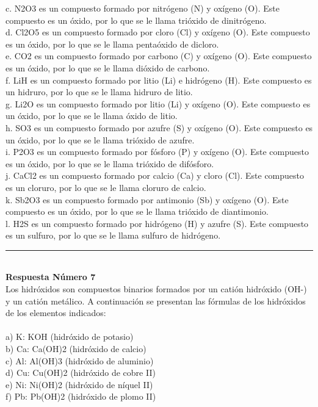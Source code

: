 \documentclass{article}
\begin{document}
c. N2O3 es un compuesto formado por nitrógeno (N) y oxígeno (O). Este compuesto es un óxido, por lo que se le llama trióxido de dinitrógeno.\\
d. Cl2O5 es un compuesto formado por cloro (Cl) y oxígeno (O). Este compuesto es un óxido, por lo que se le llama pentaóxido de dicloro.\\
e. CO2 es un compuesto formado por carbono (C) y oxígeno (O). Este compuesto es un óxido, por lo que se le llama dióxido de carbono.\\
f. LiH es un compuesto formado por litio (Li) e hidrógeno (H). Este compuesto es un hidruro, por lo que se le llama hidruro de litio.\\
g. Li2O es un compuesto formado por litio (Li) y oxígeno (O). Este compuesto es un óxido, por lo que se le llama óxido de litio.\\
h. SO3 es un compuesto formado por azufre (S) y oxígeno (O). Este compuesto es un óxido, por lo que se le llama trióxido de azufre.\\
i. P2O3 es un compuesto formado por fósforo (P) y oxígeno (O). Este compuesto es un óxido, por lo que se le llama trióxido de difósforo.\\
j. CaCl2 es un compuesto formado por calcio (Ca) y cloro (Cl). Este compuesto es un cloruro, por lo que se le llama cloruro de calcio.\\
k. Sb2O3 es un compuesto formado por antimonio (Sb) y oxígeno (O). Este compuesto es un óxido, por lo que se le llama trióxido de diantimonio.\\
l. H2S es un compuesto formado por hidrógeno (H) y azufre (S). Este compuesto es un sulfuro, por lo que se le llama sulfuro de hidrógeno.\\
\noindent\rule{\textwidth}{1pt} \\
\textbf{Respuesta Número 7} \\
Los hidróxidos son compuestos binarios formados por un catión hidróxido (OH-) y un catión metálico. A continuación se presentan las fórmulas de los hidróxidos de los elementos indicados:\\
\\
a) K: KOH (hidróxido de potasio)\\
b) Ca: Ca(OH)2 (hidróxido de calcio)\\
c) Al: Al(OH)3 (hidróxido de aluminio)\\
d) Cu: Cu(OH)2 (hidróxido de cobre II)\\
e) Ni: Ni(OH)2 (hidróxido de níquel II)\\
f) Pb: Pb(OH)2 (hidróxido de plomo II)\\
\end{document}
